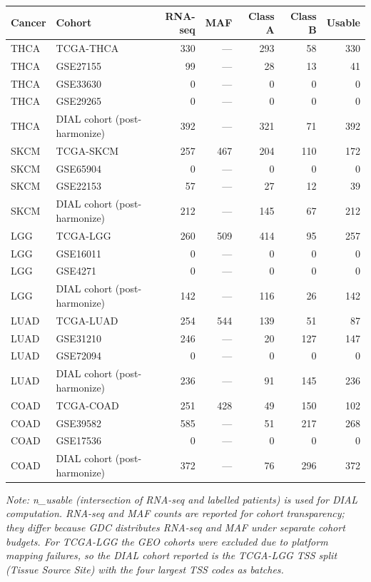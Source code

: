 \begin{tabular}{llrrrrr}
\hline
Cancer & Cohort & RNA-seq & MAF & Class A & Class B & Usable \\
\hline
THCA & TCGA-THCA & 330 & — & 293 & 58 & 330 \\
THCA & GSE27155 & 99 & — & 28 & 13 & 41 \\
THCA & GSE33630 & 0 & — & 0 & 0 & 0 \\
THCA & GSE29265 & 0 & — & 0 & 0 & 0 \\
THCA & DIAL cohort (post-harmonize) & 392 & — & 321 & 71 & 392 \\
SKCM & TCGA-SKCM & 257 & 467 & 204 & 110 & 172 \\
SKCM & GSE65904 & 0 & — & 0 & 0 & 0 \\
SKCM & GSE22153 & 57 & — & 27 & 12 & 39 \\
SKCM & DIAL cohort (post-harmonize) & 212 & — & 145 & 67 & 212 \\
LGG & TCGA-LGG & 260 & 509 & 414 & 95 & 257 \\
LGG & GSE16011 & 0 & — & 0 & 0 & 0 \\
LGG & GSE4271 & 0 & — & 0 & 0 & 0 \\
LGG & DIAL cohort (post-harmonize) & 142 & — & 116 & 26 & 142 \\
LUAD & TCGA-LUAD & 254 & 544 & 139 & 51 & 87 \\
LUAD & GSE31210 & 246 & — & 20 & 127 & 147 \\
LUAD & GSE72094 & 0 & — & 0 & 0 & 0 \\
LUAD & DIAL cohort (post-harmonize) & 236 & — & 91 & 145 & 236 \\
COAD & TCGA-COAD & 251 & 428 & 49 & 150 & 102 \\
COAD & GSE39582 & 585 & — & 51 & 217 & 268 \\
COAD & GSE17536 & 0 & — & 0 & 0 & 0 \\
COAD & DIAL cohort (post-harmonize) & 372 & — & 76 & 296 & 372 \\
\hline
\end{tabular}

\vspace{0.5em}
\noindent\textit{Note: n\_usable (intersection of RNA-seq and labelled patients) is used for DIAL computation. RNA-seq and MAF counts are reported for cohort transparency; they differ because GDC distributes RNA-seq and MAF under separate cohort budgets. For TCGA-LGG the GEO cohorts were excluded due to platform mapping failures, so the DIAL cohort reported is the TCGA-LGG TSS split (Tissue Source Site) with the four largest TSS codes as batches.}